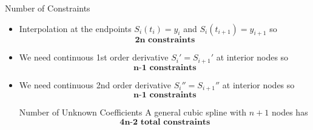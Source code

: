 \documentclass[10pt]{beamer}
\begin{document}
\begin{frame}{Number of Constraints}





\begin{itemize}
    \item Interpolation at the endpoints $S_i(t_i)=y_i$ and $S_i(t_{i+1})=y_{i+1}$ so
    $$ \textbf{2n constraints}$$
    \item We need continuous 1st order derivative $S_i'=S_{i+1}'$ at interior nodes so 
    $$\textbf{n-1 constraints}$$
    \item We need continuous 2nd order derivative $S_i''=S_{i+1}''$ at interior nodes so 
    $$\textbf{n-1 constraints}$$
\begin{block}{Number of Unknown Coefficients}
A general cubic spline with $n+1$ nodes has 
    $$\textbf{4n-2 total constraints}$$
\end{block}
\end{itemize}
    
\end{frame}
\end{document}
